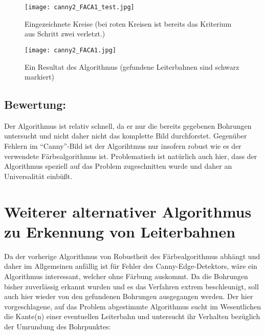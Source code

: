 \begin{figure}[H]
  \begin{center}
    \texttt{[image: canny2\_FACA1\_test.jpg]}
    \caption{Eingezeichnete Kreise (bei roten Kreisen ist bereits das Kriterium aus Schritt zwei verletzt.)}
    \label{fig:l_alg_1_test}
  \end{center}
\end{figure}

\begin{figure}[H]
  \begin{center}
    \texttt{[image: canny2\_FACA1.jpg]}
    \caption{Ein Resultat des Algorithmus (gefundene Leiterbahnen sind schwarz markiert)}
    \label{fig:l_alg_1}
  \end{center}
\end{figure}

\subsection{Bewertung:}
Der Algorithmus ist relativ schnell, da er nur die bereits gegebenen Bohrungen untersucht und nicht daher nicht das komplette Bild durchforstet. \newline
Gegenüber Fehlern im "`Canny"'-Bild ist der Algorihtmus nur insofern robust wie es der verwendete Färbealgorithmus ist. \newline
Problematisch ist natürlich auch hier, dass der Algorithmus speziell auf das Problem zugeschnitten wurde und daher an Universalität einbüßt.

\section{Weiterer alternativer Algorithmus zu Erkennung von Leiterbahnen}
Da der vorherige Algorithmus von Robustheit des Färbealgorithmus abhängt und daher im Allgemeinen anfällig ist für Fehler des Canny-Edge-Detektors, wäre ein Algorithmus interessant, welcher ohne Färbung auskommt. \newline
Da die Bohrungen bisher zuverlässig erkannt wurden und es das Verfahren extrem beschleunigt, soll auch hier wieder von den gefundenen Bohrungen ausgegangen werden. \newline
Der hier vorgeschlagene, auf das Problem abgestimmte Algorithmus sucht im Wesentlichen die Kante(n) einer eventuellen Leiterbahn und untersucht ihr Verhalten bezüglich der Umrundung des Bohrpunktes: \newline

